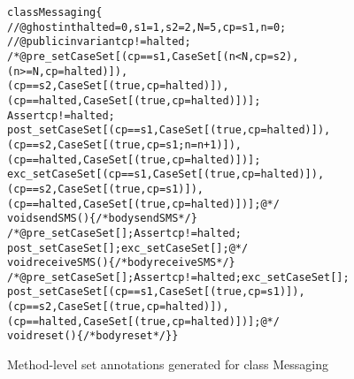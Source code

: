 \begin{figure}[t]
{\small\begin{alltt}
class Messaging \{
//@ ghost int halted = 0, s1 = 1, s2 = 2, N = 5, cp = s1, n = 0;
//@ public invariant cp != halted;\vspace*{.5em}
/*@ pre_set  CaseSet [(cp == s1, CaseSet [(n < N, cp = s2),
                                          (n >= N, cp = halted)]),
                      (cp == s2, CaseSet [(true, cp = halted)]),
                      (cp == halted, CaseSet [(true, cp = halted)])];
             Assert cp != halted;
    post_set CaseSet [(cp == s1, CaseSet [(true, cp = halted)]),
                      (cp == s2, CaseSet [(true, cp = s1; n = n + 1)]),
                      (cp == halted, CaseSet [(true, cp = halted)])];
    exc_set  CaseSet [(cp == s1, CaseSet [(true, cp = halted)]),
                      (cp == s2, CaseSet [(true, cp = s1)]),
                      (cp == halted, CaseSet [(true, cp = halted)])]; @*/
void sendSMS()\{/* body sendSMS */\}\vspace*{.5em}
/*@ pre_set  CaseSet []; Assert cp != halted;
    post_set CaseSet []; exc_set  CaseSet []; @*/
void receiveSMS()\{/* body receiveSMS */\}\vspace*{.5em}
/*@ pre_set  CaseSet []; Assert cp != halted; exc_set CaseSet [];
    post_set CaseSet [(cp == s1, CaseSet [(true, cp = s1)]),
                      (cp == s2, CaseSet [(true, cp = halted)]),
                      (cp == halted, CaseSet [(true, cp = halted)])]; @*/
void reset() \{/* body reset */\} \}\end{alltt}\vspace*{-1em}}
\caption{Method-level set annotations generated for class Messaging}\label{FigExampleStep2}
\vspace*{-1.5em}
\end{figure}

